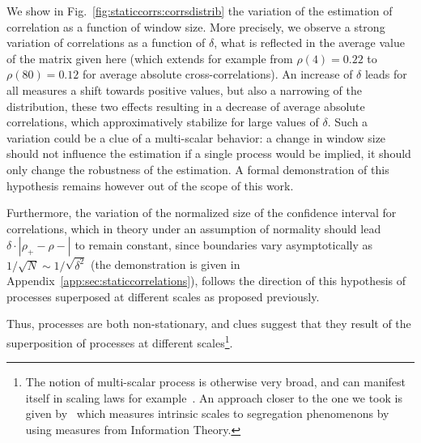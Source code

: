 We show in Fig.~\ref{fig:staticcorrs:corrsdistrib} the variation of the estimation of correlation as a function of window size. More precisely, we observe a strong variation of correlations as a function of $\delta$, what is reflected in the average value of the matrix given here (which extends for example from $\rho(4)=0.22$ to $\rho(80)=0.12$ for average absolute cross-correlations). An increase of $\delta$ leads for all measures a shift towards positive values, but also a narrowing of the distribution, these two effects resulting in a decrease of average absolute correlations, which approximatively stabilize for large values of $\delta$. Such a variation could be a clue of a multi-scalar behavior: a change in window size should not influence the estimation if a single process would be implied, it should only change the robustness of the estimation. A formal demonstration of this hypothesis remains however out of the scope of this work.



Furthermore, the variation of the normalized size of the confidence interval for correlations, which in theory under an assumption of normality should lead $\delta\cdot \left|\rho_+ - \rho -\right|$ to remain constant, since boundaries vary asymptotically as $1/\sqrt{N}\sim 1/\sqrt{\delta^2}$ (the demonstration is given in Appendix~\ref{app:sec:staticcorrelations}), follows the direction of this hypothesis of processes superposed at different scales as proposed previously.


Thus, processes are both non-stationary, and clues suggest that they result of the superposition of processes at different scales\footnote{The notion of multi-scalar process is otherwise very broad, and can manifest itself in scaling laws for example~\cite{west2017scale}. An approach closer to the one we took is given by~\cite{Chodrow31102017} which measures intrinsic scales to segregation phenomenons by using measures from Information Theory.}.


